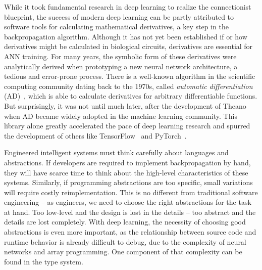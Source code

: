 \documentclass[12pt,initial,twoside,maitrise]{dms}
\numberwithin{equation}{section}
\numberwithin{table}{chapter}
\numberwithin{figure}{chapter}
\begin{document}
While it took fundamental research in deep learning to realize the connectionist blueprint, the success of modern deep learning can be partly attributed to software tools for calculating mathematical derivatives, a key step in the backpropagation algorithm. Although it has not yet been established if or how derivatives might be calculated in biological circuits, derivatives are essential for ANN training. For many years, the symbolic form of these derivatives were analytically derived when prototyping a new neural network architecture, a tedious and error-prone process. There is a well-known algorithm in the scientific computing community dating back to the 1970s, called \textit{automatic differentiation} (AD)~\citep{linnainmaa1970representation, griewank1989automatic}, which is able to calculate derivatives for arbitrary differentiable functions. But surprisingly, it was not until much later, after the development of Theano~\citep{bergstra2010theano} when AD became widely adopted in the machine learning community. This library alone greatly accelerated the pace of deep learning research and spurred the development of others like TensorFlow~\citep{abadi2016tensorflow} and PyTorch~\citep{paszke2017automatic}.

Engineered intelligent systems must think carefully about languages and abstractions. If developers are required to implement backpropagation by hand, they will have scarce time to think about the high-level characteristics of these systems. Similarly, if programming abstractions are too specific, small variations will require costly reimplementation. This is no different from traditional software engineering -- as engineers, we need to choose the right abstractions for the task at hand. Too low-level and the design is lost in the details -- too abstract and the details are lost completely. With deep learning, the necessity of choosing good abstractions is even more important, as the relationship between source code and runtime behavior is already difficult to debug, due to the complexity of neural networks and array programming. One component of that complexity can be found in the type system.
\end{document}
